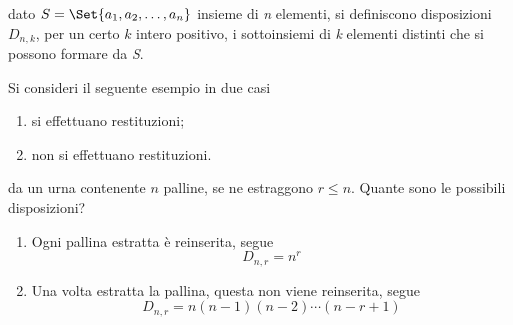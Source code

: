 \documentclass{subfiles}
\begin{document}
\begin{Definition*}
    dato \(S = \Set{a_{1}, a_{2}, \dots, a_{n}}\) insieme di \emph{n} elementi, si definiscono disposizioni \(D_{n, k}\), per un certo \(k\) intero positivo,
    i sottoinsiemi di \emph{k} elementi distinti che si possono formare da \emph{S}.
\end{Definition*}

Si consideri il seguente esempio in due casi
\begin{enumerate}
    \item si effettuano restituzioni;
    \item non si effettuano restituzioni.
\end{enumerate}

\begin{Example*}
    da un urna contenente \(n\) palline, se ne estraggono \(r \leq n\). Quante sono le possibili disposizioni?
    \begin{enumerate}
        \item Ogni pallina estratta è reinserita, segue
              \begin{equation}
                  D_{n, r} = n^{r}
              \end{equation}

        \item Una volta estratta la pallina, questa non viene reinserita, segue
              \begin{equation}
                  D_{n, r} = n(n - 1)(n- 2)\cdots(n-r + 1)
              \end{equation}
    \end{enumerate}
\end{Example*}
\end{document}
